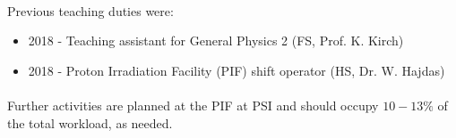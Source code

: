 \documentclass[12pt]{article}
\begin{document}
\paragraph{}
Previous teaching duties were:
\begin{itemize}
\item
2018 - Teaching assistant for General Physics 2 (FS, Prof. K. Kirch)
\item
2018 - Proton Irradiation Facility (PIF) shift operator (HS, Dr. W. Hajdas)
\end{itemize}
\paragraph{}
Further activities are planned at the PIF at PSI and should occupy $10-13 \%$ of the total workload, as needed.\\ 
\vspace{5.1pt}
\end{document}
